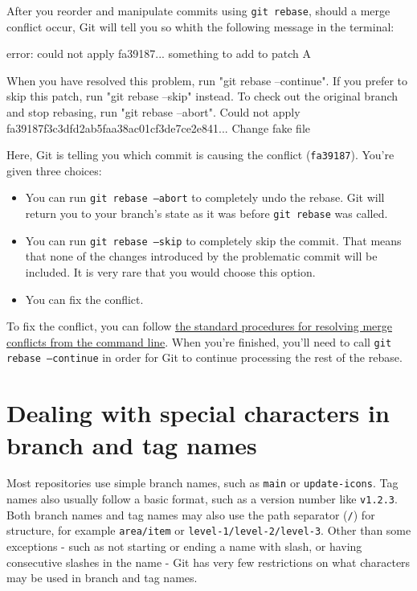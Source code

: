 After you reorder and manipulate commits using \texttt{git rebase}, should a merge conflict occur, Git will tell you so whith the following message in the terminal:
\begin{codeblock}[language=bash]
error: could not apply fa39187... something to add to patch A

When you have resolved this problem, run "git rebase --continue".
If you prefer to skip this patch, run "git rebase --skip" instead.
To check out the original branch and stop rebasing, run "git rebase --abort".
Could not apply fa39187f3c3dfd2ab5faa38ac01cf3de7ce2e841... Change fake file
\end{codeblock}

Here, Git is telling you which commit is causing the conflict (\texttt{fa39187}). You're given three choices:
\begin{itemize}
    \item You can run \texttt{git rebase --abort} to completely undo the rebase. Git will return you to your branch's state as it was before \texttt{git rebase} was called.
    \item You can run \texttt{git rebase --skip} to completely skip the commit. That means that none of the changes introduced by the problematic commit will be included. It is very rare that you would choose this option. 
    \item You can fix the conflict. 
\end{itemize}

To fix the conflict, you can follow \href{https://docs.github.com/en/pull-requests/collaborating-with-pull-requests/addressing-merge-conflicts/resolving-a-merge-conflict-using-the-command-line}{the standard procedures for resolving merge conflicts from the command line}. When you're finished, you'll need to call \texttt{git rebase --continue} in order for Git to continue processing the rest of the rebase.

\section{Dealing with special characters in branch and tag names}
Most repositories use simple branch names, such as \texttt{main} or \texttt{update-icons}. Tag names also usually follow a basic format, such as a version number like \texttt{v1.2.3}. Both branch names and tag names may also use the path separator (\texttt{/}) for structure, for example \texttt{area/item} or \texttt{level-1/level-2/level-3}. Other than some exceptions - such as not starting or ending a name with slash, or having consecutive slashes in the name - Git has very few restrictions on what characters may be used in branch and tag names. 

